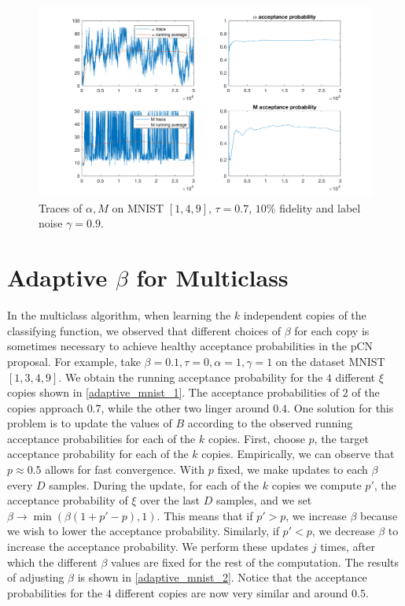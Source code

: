 \documentclass{siamart1116}
\begin{document}
        \begin{figure}[!htb]
        \centering
        \caption{\label{aM_mnist_1}Traces of $\alpha, M$ on MNIST $[1, 4, 9]$, $\tau = 0.7$, $10\%$ fidelity and label noise $\gamma = 0.9$.}
        \includegraphics[width=0.8\linewidth]{choose_hyp/a_M/tau=0_7.png}
        \end{figure}

\section{Adaptive $\beta$ for Multiclass}
    In the multiclass algorithm, when learning the $k$ independent copies of the classifying function, we observed that different choices of $\beta$ for each copy is sometimes necessary to achieve healthy acceptance probabilities in the pCN proposal. For example, take $\beta=0.1,\tau=0,\alpha=1,\gamma=1$ on the dataset MNIST $[1,3,4,9]$. We obtain the running acceptance probability for the $4$ different $\xi$ copies shown in \cref{adaptive_mnist_1}. The acceptance probabilities of $2$ of the copies approach $0.7$, while the other two linger around $0.4$. One solution for this problem is to update the values of $B$ according to the observed running acceptance probabilities for each of the $k$ copies. First, choose $p$, the target acceptance probability for each of the $k$ copies. Empirically, we can observe that $p\approx0.5$ allows for fast convergence. With $p$ fixed, we make updates to each $\beta$ every $D$ samples. During the update, for each of the $k$ copies we compute $p'$, the acceptance probability of $\xi$ over the last $D$ samples, and we set $\beta \to \min(\beta(1+p'-p),1)$. This means that if $p'>p$, we increase $\beta$ because we wish to lower the acceptance probability. Similarly, if $p'<p$, we decrease $\beta$ to increase the acceptance probability. We perform these updates $j$ times, after which the different $\beta$ values are fixed for the rest of the computation. The results of adjusting $\beta$ is shown in \cref{adaptive_mnist_2}. Notice that the acceptance probabilities for the $4$ different copies are now very similar and around $0.5$.
\end{document}
